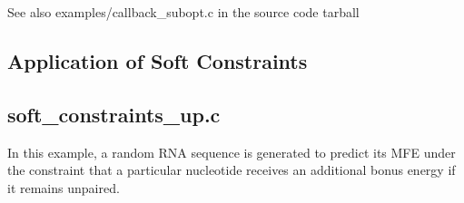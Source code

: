 \begin{DoxyCodeInclude}{0}
\DoxyCodeLine{\textcolor{comment}{   *  5 kcal/mol of the MFE and pass it the address of the callback and counter}}
\DoxyCodeLine{\textcolor{comment}{   *  variable}}
\DoxyCodeLine{\textcolor{comment}{   */}}
\DoxyCodeLine{}
\DoxyCodeLine{  \textcolor{comment}{/* cleanup memory */}}
\DoxyCodeLine{}
\DoxyCodeLine{\}}
\end{DoxyCodeInclude}
 \begin{DoxySeeAlso}{See also}
{\ttfamily examples/callback\+\_\+subopt.\+c} in the source code tarball
\end{DoxySeeAlso}
\hypertarget{examples_c_ex_c_sc}{}\subsection{Application of Soft Constraints}\label{examples_c_ex_c_sc}
\subsection*{soft\+\_\+constraints\+\_\+up.\+c }

In this example, a random R\+NA sequence is generated to predict its M\+FE under the constraint that a particular nucleotide receives an additional bonus energy if it remains unpaired.



